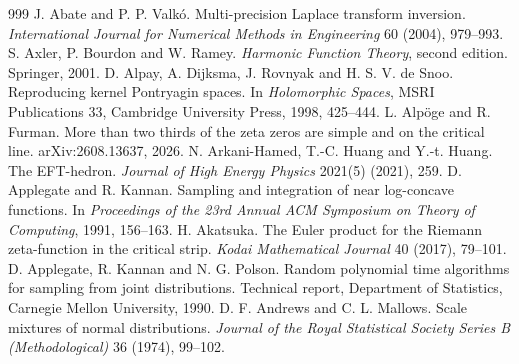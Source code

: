 \begin{thebibliography}{999}\small\setlength{\itemsep}{0pt}\setlength{\parsep}{0pt}\setlength{\parskip}{0pt}
 J. Abate and P. P. Valk\'o. Multi-precision Laplace transform inversion. \emph{International Journal for Numerical Methods in Engineering} 60 (2004), 979--993.
 S. Axler, P. Bourdon and W. Ramey. \emph{Harmonic Function Theory}, second edition. Springer, 2001.
 D. Alpay, A. Dijksma, J. Rovnyak and H. S. V. de Snoo. Reproducing kernel Pontryagin spaces. In \emph{Holomorphic Spaces}, MSRI Publications 33, Cambridge University Press, 1998, 425--444.
 L. Alp\"oge and R. Furman. More than two thirds of the zeta zeros are simple and on the critical line. arXiv:2608.13637, 2026.
 N. Arkani-Hamed, T.-C. Huang and Y.-t. Huang. The EFT-hedron. \emph{Journal of High Energy Physics} 2021(5) (2021), 259.
 D. Applegate and R. Kannan. Sampling and integration of near log-concave functions. In \emph{Proceedings of the 23rd Annual ACM Symposium on Theory of Computing}, 1991, 156--163.
 H. Akatsuka. The Euler product for the Riemann zeta-function in the critical strip. \emph{Kodai Mathematical Journal} 40 (2017), 79--101.
 D. Applegate, R. Kannan and N. G. Polson. Random polynomial time algorithms for sampling from joint distributions. Technical report, Department of Statistics, Carnegie Mellon University, 1990.
 D. F. Andrews and C. L. Mallows. Scale mixtures of normal distributions. \emph{Journal of the Royal Statistical Society Series B (Methodological)} 36 (1974), 99--102.

\end{thebibliography}
